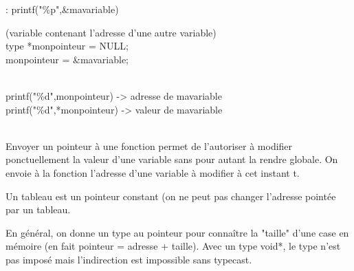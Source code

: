  : printf("\%p",\&mavariable) \\

\par

 (variable contenant l'adresse d'une autre variable) \\
type *monpointeur = NULL; \\
monpointeur = \&mavariable; \\

\par
{} \\
printf("\%d",monpointeur) -> adresse de mavariable \\
printf("\%d",*monpointeur) -> valeur de mavariable \\

\par
{} \\
Envoyer un pointeur à une fonction permet de l'autoriser à modifier ponctuellement la valeur d'une variable sans pour autant la rendre globale. On envoie à la fonction l'adresse d'une variable à modifier à cet instant t.\\

\par

 Un tableau est un pointeur constant (on ne peut pas changer l'adresse pointée par un tableau. \\

\par

 En général, on donne un type au pointeur pour connaître la "taille" d'une case en mémoire (en fait pointeur = adresse + taille). Avec un type void*, le type n'est pas imposé mais l'indirection est impossible sans typecast.

\newpage
{}

